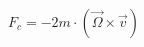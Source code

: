 \documentclass[preview, border=8pt, 12pt]{standalone}
\begin{document}
$\displaystyle 
F_c = -2m \cdot (\vec{\Omega} \times \vec{v})
$
\end{document}
